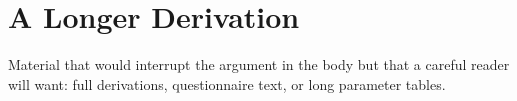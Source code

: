 

\section{A Longer Derivation}

Material that would interrupt the argument in the body but that a careful
reader will want: full derivations, questionnaire text, or long parameter
tables.

\lipsum[10][1-4]
